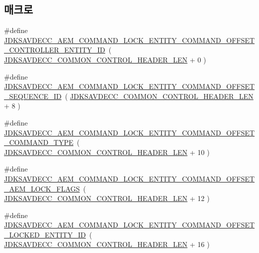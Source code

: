\subsection*{매크로}
\begin{DoxyCompactItemize}
\item 
\#define \hyperlink{group__command__lock__entity_ga314315c8a3f1f29414e04e030c7545e5}{J\+D\+K\+S\+A\+V\+D\+E\+C\+C\+\_\+\+A\+E\+M\+\_\+\+C\+O\+M\+M\+A\+N\+D\+\_\+\+L\+O\+C\+K\+\_\+\+E\+N\+T\+I\+T\+Y\+\_\+\+C\+O\+M\+M\+A\+N\+D\+\_\+\+O\+F\+F\+S\+E\+T\+\_\+\+C\+O\+N\+T\+R\+O\+L\+L\+E\+R\+\_\+\+E\+N\+T\+I\+T\+Y\+\_\+\+ID}~( \hyperlink{group__jdksavdecc__avtp__common__control__header_gaae84052886fb1bb42f3bc5f85b741dff}{J\+D\+K\+S\+A\+V\+D\+E\+C\+C\+\_\+\+C\+O\+M\+M\+O\+N\+\_\+\+C\+O\+N\+T\+R\+O\+L\+\_\+\+H\+E\+A\+D\+E\+R\+\_\+\+L\+EN} + 0 )
\item 
\#define \hyperlink{group__command__lock__entity_ga13e26006a52d1ac962afa2074f7a9e53}{J\+D\+K\+S\+A\+V\+D\+E\+C\+C\+\_\+\+A\+E\+M\+\_\+\+C\+O\+M\+M\+A\+N\+D\+\_\+\+L\+O\+C\+K\+\_\+\+E\+N\+T\+I\+T\+Y\+\_\+\+C\+O\+M\+M\+A\+N\+D\+\_\+\+O\+F\+F\+S\+E\+T\+\_\+\+S\+E\+Q\+U\+E\+N\+C\+E\+\_\+\+ID}~( \hyperlink{group__jdksavdecc__avtp__common__control__header_gaae84052886fb1bb42f3bc5f85b741dff}{J\+D\+K\+S\+A\+V\+D\+E\+C\+C\+\_\+\+C\+O\+M\+M\+O\+N\+\_\+\+C\+O\+N\+T\+R\+O\+L\+\_\+\+H\+E\+A\+D\+E\+R\+\_\+\+L\+EN} + 8 )
\item 
\#define \hyperlink{group__command__lock__entity_gae0b1017759458574ee75c0bb85c1eb0c}{J\+D\+K\+S\+A\+V\+D\+E\+C\+C\+\_\+\+A\+E\+M\+\_\+\+C\+O\+M\+M\+A\+N\+D\+\_\+\+L\+O\+C\+K\+\_\+\+E\+N\+T\+I\+T\+Y\+\_\+\+C\+O\+M\+M\+A\+N\+D\+\_\+\+O\+F\+F\+S\+E\+T\+\_\+\+C\+O\+M\+M\+A\+N\+D\+\_\+\+T\+Y\+PE}~( \hyperlink{group__jdksavdecc__avtp__common__control__header_gaae84052886fb1bb42f3bc5f85b741dff}{J\+D\+K\+S\+A\+V\+D\+E\+C\+C\+\_\+\+C\+O\+M\+M\+O\+N\+\_\+\+C\+O\+N\+T\+R\+O\+L\+\_\+\+H\+E\+A\+D\+E\+R\+\_\+\+L\+EN} + 10 )
\item 
\#define \hyperlink{group__command__lock__entity_gaa15361445dce46911bcf3af359a00ed5}{J\+D\+K\+S\+A\+V\+D\+E\+C\+C\+\_\+\+A\+E\+M\+\_\+\+C\+O\+M\+M\+A\+N\+D\+\_\+\+L\+O\+C\+K\+\_\+\+E\+N\+T\+I\+T\+Y\+\_\+\+C\+O\+M\+M\+A\+N\+D\+\_\+\+O\+F\+F\+S\+E\+T\+\_\+\+A\+E\+M\+\_\+\+L\+O\+C\+K\+\_\+\+F\+L\+A\+GS}~( \hyperlink{group__jdksavdecc__avtp__common__control__header_gaae84052886fb1bb42f3bc5f85b741dff}{J\+D\+K\+S\+A\+V\+D\+E\+C\+C\+\_\+\+C\+O\+M\+M\+O\+N\+\_\+\+C\+O\+N\+T\+R\+O\+L\+\_\+\+H\+E\+A\+D\+E\+R\+\_\+\+L\+EN} + 12 )
\item 
\#define \hyperlink{group__command__lock__entity_ga2db4b6fc7af59328cf85b09d2bd7781f}{J\+D\+K\+S\+A\+V\+D\+E\+C\+C\+\_\+\+A\+E\+M\+\_\+\+C\+O\+M\+M\+A\+N\+D\+\_\+\+L\+O\+C\+K\+\_\+\+E\+N\+T\+I\+T\+Y\+\_\+\+C\+O\+M\+M\+A\+N\+D\+\_\+\+O\+F\+F\+S\+E\+T\+\_\+\+L\+O\+C\+K\+E\+D\+\_\+\+E\+N\+T\+I\+T\+Y\+\_\+\+ID}~( \hyperlink{group__jdksavdecc__avtp__common__control__header_gaae84052886fb1bb42f3bc5f85b741dff}{J\+D\+K\+S\+A\+V\+D\+E\+C\+C\+\_\+\+C\+O\+M\+M\+O\+N\+\_\+\+C\+O\+N\+T\+R\+O\+L\+\_\+\+H\+E\+A\+D\+E\+R\+\_\+\+L\+EN} + 16 )

\end{DoxyCompactItemize}
